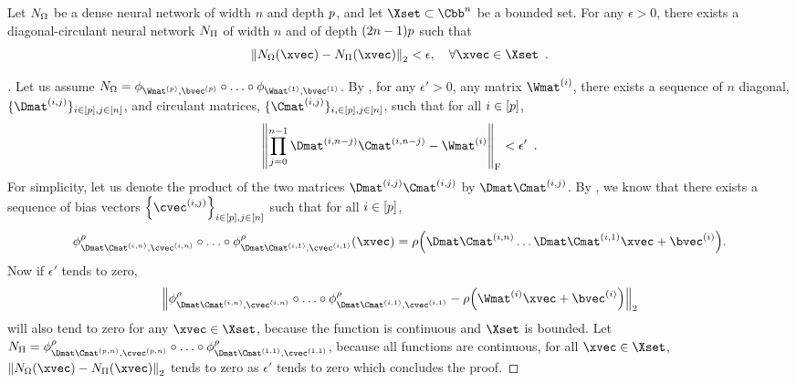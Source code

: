 \begin{lemma} \label{lemma:ch4-dcnn_approx_neural_network}
  Let $N_\Omega$ be a dense neural network of width $n$ and depth $p$,
  and let $\Xset \subset \Cn$ be a bounded set.
  For any $\epsilon > 0$, there exists a diagonal-circulant neural network $N_\Pi$ of width $n$ and of depth $(2n-1)p$ such that 
  \begin{equation}
    \norm{\nn_\Omega(\xvec) - \nn_\Pi(\xvec)}_2 < \epsilon, \quad \forall \xvec \in \Xset \enspace.
  \end{equation}
  \removespace
\end{lemma}

\begin{proof}[]
  Let us assume $\nn_\Omega = \layer_{\Wmat^{(\depth)}, \bvec^{(\depth)}} \circ \ldots \circ \layer_{\Wmat^{(1)}, \bvec^{(1)}}$.
  By , for any $\epsilon' > 0$, any matrix $\Wmat^{(i)}$, there exists a sequence of $n$ diagonal, $\{\Dmat^{(i, j)}\}_{i \in [\depth], j \in [n]}$, and circulant matrices, $\{\Cmat^{(i, j)}\}_{i, \in [\depth], j \in [n]}$, such that for all $i \in [p]$,
  \begin{equation}
    \norm{\prod_{j=0}^{n-1} \Dmat^{(i,n-j)} \Cmat^{(i,n-j)} - \Wmat^{(i)}}_\fro < \epsilon' \enspace.
  \end{equation}
  For simplicity, let us denote the product of the two matrices $\Dmat^{(i,j)} \Cmat^{(i,j)}$ by $\Dmat\Cmat^{(i,j)}$.
  By , we know that there exists a sequence of bias vectors $\left\{ \cvec^{(i,j)} \right\}_{i \in [\depth], j \in [n]}$ such that for all $i\in[p]$, 
  \begin{equation}
    \layer^\act_{\Dmat\Cmat^{(i, n)}, \cvec^{(i, n)}} \circ \ldots \circ \layer^\act_{\Dmat\Cmat^{(i, 1)}, \cvec^{(i, 1)}}(\xvec) = \act \left(\Dmat\Cmat^{(i,n)} \ldots \Dmat\Cmat^{(i,1)} \xvec + \bvec^{(i)} \right).
  \end{equation}
  Now if $\epsilon'$ tends to zero,
  \begin{equation}
    \norm{ \layer^\act_{\Dmat\Cmat^{(i,n)},\cvec^{(i,n)}} \circ \ldots \circ \layer^\act_{\Dmat\Cmat^{(i,1)}, \cvec^{(i,1)}} - \act \left(\Wmat^{(i)} \xvec + \bvec^{(i)} \right)}_2
  \end{equation}
  will also tend to zero for any $\xvec \in \Xset$, because the \relu function is continuous and $\Xset$ is bounded.
  Let $\nn_\Pi = \layer^\act_{\Dmat\Cmat^{(\depth,n)},\cvec^{(\depth,n)}} \circ \ldots \circ \layer^\act_{\Dmat\Cmat^{(1,1)}, \cvec^{(1,1)}}$, because all functions are continuous, for all $\xvec \in \Xset$, $\norm{\nn_\Omega(\xvec) - \nn_\Pi(\xvec)}_2$ tends to zero as $\epsilon'$ tends to zero which concludes the proof.
\end{proof}


